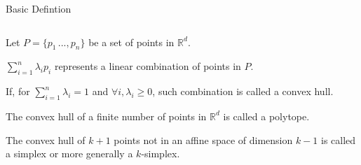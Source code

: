 \documentclass[10pt]{beamer}
\begin{document}
\begin{frame}{Basic Defintion}
\begin{columns}
\begin{column}{0.8\textwidth}
		Let $P=\lbrace p_1\,...,p_n\rbrace$ be a set of points in $\mathbb{R}^d$.	
		\bigskip

		$\sum_{i=1}^n \lambda_ip_i$ represents a \alert{linear combination} of points in $P$.
		\bigskip
	
		If, for $\sum_{i=1}^n \lambda_i=1$ and $\forall i, \lambda_i \geq 0$, such combination is called
		\alert{a convex hull}.
		\bigskip
	
		The convex hull of a finite number of points in $\mathbb{R}^d$ is called \alert{a polytope}.   
		\bigskip
	
		The convex hull of $k+1$ points not in an affine space of dimension $k-1$ 
		is called \alert{a simplex} or more generally \alert{a $k$-simplex}.
	\end{column}
\end{columns} 		
\end{frame}
\end{document}
